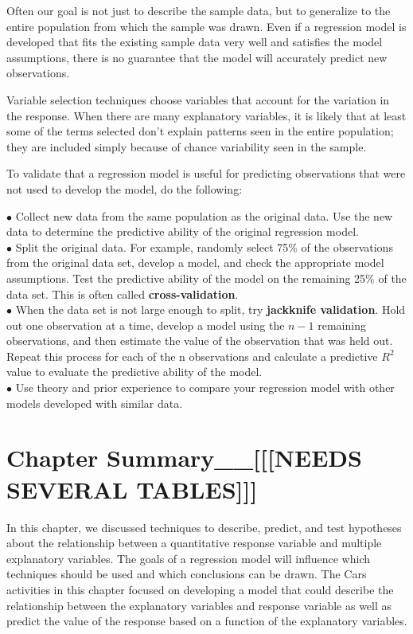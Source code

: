 \documentclass[
]{report}
\theoremstyle{definition}
\theoremstyle{definition}
\theoremstyle{definition}
\theoremstyle{definition}
\theoremstyle{remark}
\begin{document}
Often our goal is not just to describe the sample data, but to generalize to the entire population from which the sample was drawn. Even if a regression model is developed that fits the existing sample data very well and satisfies the model assumptions, there is no guarantee that the model will accurately predict new observations.

Variable selection techniques choose variables that account for the variation in the response. When there are many explanatory variables, it is likely that at least some of the terms selected don't explain patterns seen in the entire population; they are included simply because of chance variability seen in the sample.

To validate that a regression model is useful for predicting observations that were not used to develop
the model, do the following:

\(\bullet\) Collect new data from the same population as the original data. Use the new data to determine the
predictive ability of the original regression model.\\
\(\bullet\) Split the original data. For example, randomly select 75\% of the observations from the original data
set, develop a model, and check the appropriate model assumptions. Test the predictive ability of the
model on the remaining 25\% of the data set. This is often called \textbf{cross-validation}.\\
\(\bullet\) When the data set is not large enough to split, try \textbf{jackknife validation}. Hold out one observation at
a time, develop a model using the \(n-1\) remaining observations, and then estimate the value of the observation that was held out. Repeat this process for each of the n observations and calculate a predictive \(R^2\) value to evaluate the predictive ability of the model.\\
\(\bullet\) Use theory and prior experience to compare your regression model with other models developed with
similar data.

\hypertarget{chapter-summary__needs-several-tables}{%
\section{Chapter Summary\_\_{[}{[}{[}NEEDS SEVERAL TABLES{]}{]}{]}}\label{chapter-summary__needs-several-tables}}

In this chapter, we discussed techniques to describe, predict, and test hypotheses about the relationship
between a quantitative response variable and multiple explanatory variables. The goals of a regression model
will influence which techniques should be used and which conclusions can be drawn. The Cars activities
in this chapter focused on developing a model that could describe the relationship between the explanatory
variables and response variable as well as predict the value of the response based on a function of the explanatory variables.
\end{document}
